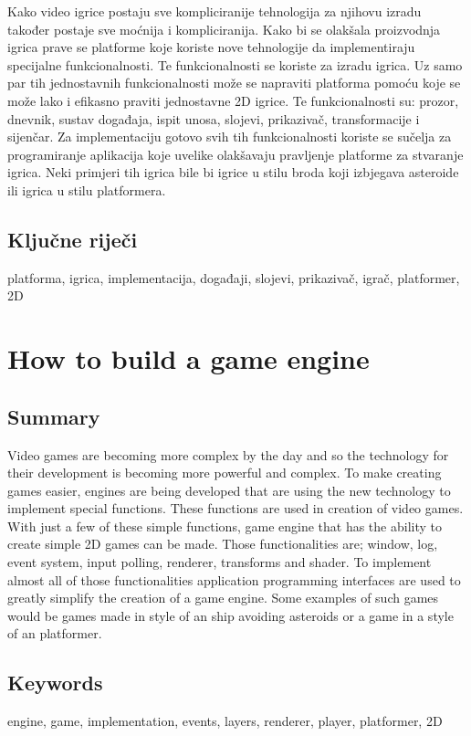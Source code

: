 \documentclass{mathos}
\begin{document}
Kako video igrice postaju sve kompliciranije tehnologija za njihovu izradu također postaje sve moćnija i kompliciranija. Kako bi se olakšala proizvodnja igrica prave se platforme koje
koriste nove tehnologije da implementiraju specijalne funkcionalnosti. Te funkcionalnosti se koriste za izradu igrica. Uz samo par tih jednostavnih funkcionalnosti može se napraviti platforma
pomoću koje se može lako i efikasno praviti jednostavne 2D igrice. Te funkcionalnosti su: prozor, dnevnik, sustav događaja, ispit unosa, slojevi, prikazivač, transformacije i
sijenčar. Za implementaciju gotovo svih tih funkcionalnosti koriste se sučelja za programiranje aplikacija koje uvelike olakšavaju pravljenje platforme za stvaranje igrica. Neki
primjeri tih igrica bile bi igrice u stilu broda koji izbjegava asteroide ili igrica u stilu platformera.

\section*{Ključne riječi}

platforma, igrica, implementacija, događaji, slojevi, prikazivač, igrač, platformer, 2D

\chapter*{How to build a game engine}

\section*{Summary}

Video games are becoming more complex by the day and so the technology for their development is becoming more powerful and complex. To make creating games easier, engines are
being developed that are using the new technology to implement special functions. These functions are used in creation of video games. With just a few of these simple functions,
game engine that has the ability to create simple 2D games can be made. Those functionalities are; window, log, event system, input polling, renderer, transforms and shader. To
implement almost all of those functionalities application programming interfaces are used to greatly simplify the creation of a game engine. Some examples of such games would be
games made in style of an ship avoiding asteroids or a game in a style of an platformer.

\section*{Keywords}

engine, game, implementation, events, layers, renderer, player, platformer, 2D
\end{document}
